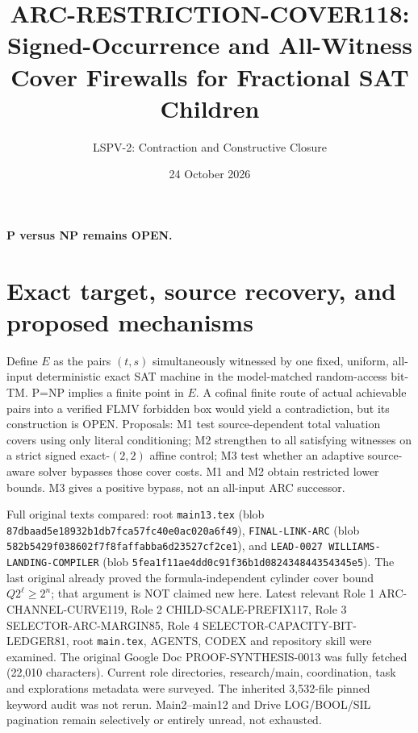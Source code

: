 \documentclass[11pt]{article}
\title{ARC-RESTRICTION-COVER118: Signed-Occurrence and All-Witness Cover Firewalls for Fractional SAT Children}
\author{LSPV-2: Contraction and Constructive Closure}
\date{24 October 2026}
\begin{document}
\maketitle
\begin{center}\textbf{P versus NP remains OPEN.}\end{center}
\section{Exact target, source recovery, and proposed mechanisms}
Define $E$ as the pairs $(t,s)$ simultaneously witnessed by one fixed, uniform, all-input deterministic exact SAT machine in the model-matched random-access bit-TM. P=NP implies a finite point in $E$. A cofinal finite route of actual achievable pairs into a verified FLMV forbidden box would yield a contradiction, but its construction is OPEN. Proposals: M1 test source-dependent total valuation covers using only literal conditioning; M2 strengthen to all satisfying witnesses on a strict signed exact-$(2,2)$ affine control; M3 test whether an adaptive source-aware solver bypasses those cover costs. M1 and M2 obtain restricted lower bounds. M3 gives a positive bypass, not an all-input ARC successor.

Full original texts compared: root \texttt{main13.tex} (blob \texttt{87dbaad5e18932b1db7fca57fc40e0ac020a6f49}), \texttt{FINAL-LINK-ARC} (blob \texttt{582b5429f038602f7f8faffabba6d23527cf2ce1}), and \texttt{LEAD-0027 WILLIAMS-LANDING-COMPILER} (blob \texttt{5fea1f11ae4dd0c91f36b1d082434844354345e5}). The last original already proved the formula-independent cylinder cover bound $Q2^\ell\ge2^n$; that argument is NOT claimed new here. Latest relevant Role 1 ARC-CHANNEL-CURVE119, Role 2 CHILD-SCALE-PREFIX117, Role 3 SELECTOR-ARC-MARGIN85, Role 4 SELECTOR-CAPACITY-BIT-LEDGER81, root \texttt{main.tex}, AGENTS, CODEX and repository skill were examined. The original Google Doc PROOF-SYNTHESIS-0013 was fully fetched (22,010 characters). Current role directories, research/main, coordination, task and explorations metadata were surveyed. The inherited 3,532-file pinned keyword audit was not rerun. Main2--main12 and Drive LOG/BOOL/SIL pagination remain selectively or entirely unread, not exhausted.
\end{document}
